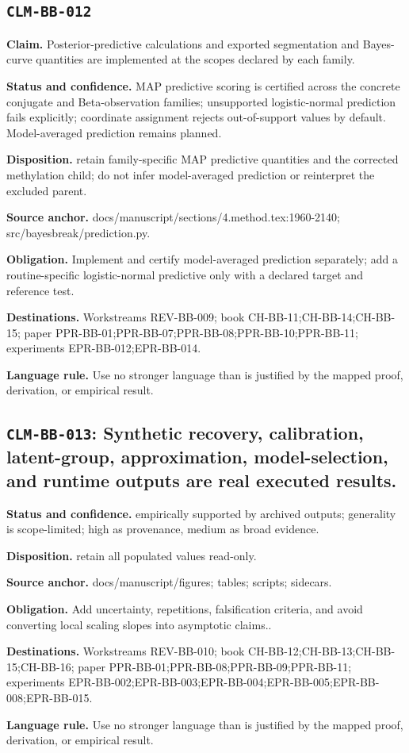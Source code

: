 \subsection{\texttt{CLM-BB-012}}
\textbf{Claim.} Posterior-predictive calculations and exported segmentation and Bayes-curve quantities are implemented at the scopes declared by each family.\par
\textbf{Status and confidence.} MAP predictive scoring is certified across the concrete conjugate and Beta-observation families; unsupported logistic-normal prediction fails explicitly; coordinate assignment rejects out-of-support values by default. Model-averaged prediction remains planned.\par
\textbf{Disposition.} retain family-specific MAP predictive quantities and the corrected methylation child; do not infer model-averaged prediction or reinterpret the excluded parent.\par
\textbf{Source anchor.} docs/manuscript/sections/4.method.tex:1960-2140; src/bayesbreak/prediction.py.\par
\textbf{Obligation.} Implement and certify model-averaged prediction separately; add a routine-specific logistic-normal predictive only with a declared target and reference test.\par
\textbf{Destinations.} Workstreams REV-BB-009; book CH-BB-11;CH-BB-14;CH-BB-15; paper PPR-BB-01;PPR-BB-07;PPR-BB-08;PPR-BB-10;PPR-BB-11; experiments EPR-BB-012;EPR-BB-014.\par
\textbf{Language rule.} Use no stronger language than is justified by the mapped proof, derivation, or empirical result.

\subsection[\texttt{CLM-BB-013}]{\texttt{CLM-BB-013}: Synthetic recovery, calibration, latent-group, approximation, model-selection, and runtime outputs are real executed results.}
\textbf{Status and confidence.} empirically supported by archived outputs; generality is scope-limited; high as provenance, medium as broad evidence.\par
\textbf{Disposition.} retain all populated values read-only.\par
\textbf{Source anchor.} docs/manuscript/figures; tables; scripts; sidecars.\par
\textbf{Obligation.} Add uncertainty, repetitions, falsification criteria, and avoid converting local scaling slopes into asymptotic claims..\par
\textbf{Destinations.} Workstreams REV-BB-010; book CH-BB-12;CH-BB-13;CH-BB-15;CH-BB-16; paper PPR-BB-01;PPR-BB-08;PPR-BB-09;PPR-BB-11; experiments EPR-BB-002;EPR-BB-003;EPR-BB-004;EPR-BB-005;EPR-BB-008;EPR-BB-015.\par
\textbf{Language rule.} Use no stronger language than is justified by the mapped proof, derivation, or empirical result.

